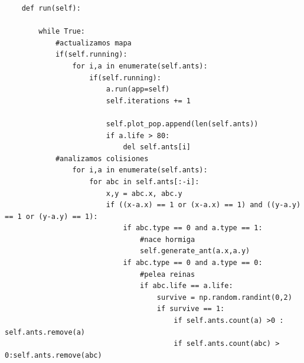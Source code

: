 \documentclass[10pt]{article}
\begin{document}
\begin{verbatim}
    def run(self):
        
        while True:
            #actualizamos mapa
            if(self.running):
                for i,a in enumerate(self.ants):
                    if(self.running):
                        a.run(app=self)
                        self.iterations += 1
                        
                        self.plot_pop.append(len(self.ants))
                        if a.life > 80:
                            del self.ants[i]
            #analizamos colisiones
                for i,a in enumerate(self.ants):
                    for abc in self.ants[:-i]:
                        x,y = abc.x, abc.y
                        if ((x-a.x) == 1 or (x-a.x) == 1) and ((y-a.y) == 1 or (y-a.y) == 1):
                            if abc.type == 0 and a.type == 1:
                                #nace hormiga
                                self.generate_ant(a.x,a.y)
                            if abc.type == 0 and a.type == 0:
                                #pelea reinas
                                if abc.life == a.life:
                                    survive = np.random.randint(0,2)
                                    if survive == 1:
                                        if self.ants.count(a) >0 : self.ants.remove(a)
                                        if self.ants.count(abc) > 0:self.ants.remove(abc)
                                    


\end{verbatim}
\end{document}
